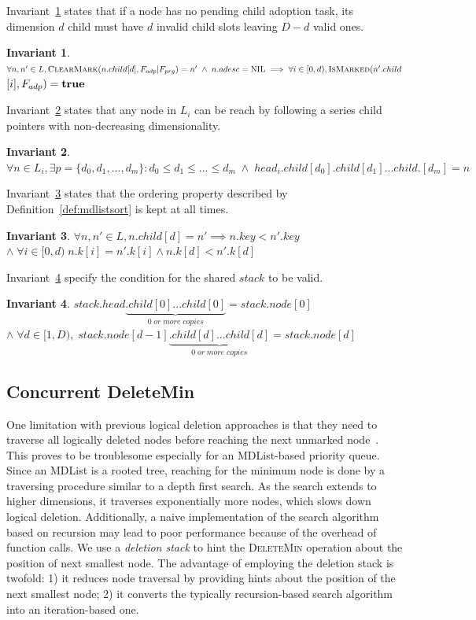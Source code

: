 \documentclass[10pt,journal,letter,compsoc]{IEEEtran}
\newtheorem{invariant}{Invariant}
\newcommand\NIL{\text{NIL}}
\newcommand\TRUE{\text{\textbf{true}}}
\begin{document}
Invariant~\ref{inv:adpflag} states that if a node has no pending child adoption task, its dimension $d$ child must have $d$ invalid child slots leaving $D-d$ valid ones.

\begin{invariant} \label{inv:adpflag}
$\forall n,n' \in L,\textsc{ClearMark}(n.child[d],F_{adp}|F_{prg}) \linebreak=n'\;\land\;n.adesc=\NIL \implies \forall i \in [0,d), \textsc{IsMarked}(n'.child$ $[i],F_{adp})=\TRUE$
\end{invariant}

\noindent Invariant~\ref{inv:reachability} states that any node in $L_i$ can be reach by following a series child pointers with non-decreasing dimensionality.
\begin{invariant} \label{inv:reachability}
    $\forall n \in L_i, \exists p=\{d_0,d_1,...,d_m\} : d_0\le d_1 \le ... \le d_m\;\land\;head_i.child[d_0].child[d_1]...child.[d_m]=n$
\end{invariant}

\noindent Invariant~\ref{inv:order} states that the ordering property described by Definition~\ref{def:mdlistsort} is kept at all times.
\begin{invariant} \label{inv:order}
    $\forall n,n' \in L, n.child[d]=n' \implies n.key < n'.key$ $\land\;\forall i \in [0, d)\; n.k[i] = n'.k[i] \land n.k[d]<n'.k[d]$
\end{invariant}

\noindent Invariant~\ref{inv:stackrelation} specify the condition for the shared $stack$ to be valid.
\vspace{-0.05in}
\begin{invariant} \label{inv:stackrelation}
    $stack.head\underbrace{.child[0]...child[0]}_{0\;or\;more\;copies}=stack.node[0]$ $\land\;\forall d \in [1,D),\;stack.node[d-1]\underbrace{.child[d]...child[d]}_{0\;or\;more\;copies}=stack.node[d]$
\end{invariant}

\subsection{Concurrent DeleteMin}
\label{sec:cpqueuedel}
One limitation with previous logical deletion approaches is that they need to traverse all logically deleted nodes before reaching the next unmarked node~\cite{linden2013skiplist,shavit2000skiplist}.
This proves to be troublesome especially for an MDList-based priority queue. 
Since an MDList is a rooted tree, reaching for the minimum node is done by a traversing procedure similar to a depth first search.
As the search extends to higher dimensions, it traverses exponentially more nodes, which slows down logical deletion.
Additionally, a naive implementation of the search algorithm based on recursion may lead to poor performance because of the overhead of function calls.  
We use a \emph{deletion stack} to hint the \textsc{DeleteMin} operation about the position of next smallest node. 
The advantage of employing the deletion stack is twofold: 1) it reduces node traversal by providing hints about the position of the next smallest node; 2) it converts the typically recursion-based search algorithm into an iteration-based one.
\end{document}
